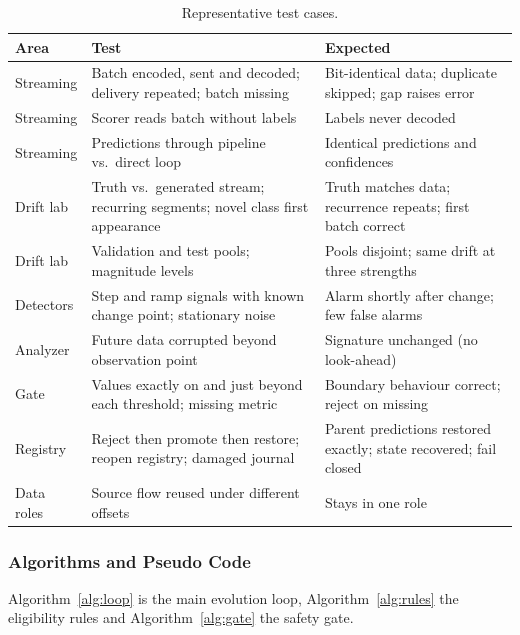 \documentclass{article}
\begin{document}
\begin{table}[h]
\centering
\caption{Representative test cases.}
\label{tab:tests}
\small
\begin{tabular}{p{3.0cm}p{6.2cm}p{3.4cm}}
\toprule
Area & Test & Expected \\
\midrule
Streaming & Batch encoded, sent and decoded; delivery repeated; batch missing & Bit-identical data; duplicate skipped; gap raises error \\
Streaming & Scorer reads batch without labels & Labels never decoded \\
Streaming & Predictions through pipeline vs.\ direct loop & Identical predictions and confidences \\
Drift lab & Truth vs.\ generated stream; recurring segments; novel class first appearance & Truth matches data; recurrence repeats; first batch correct \\
Drift lab & Validation and test pools; magnitude levels & Pools disjoint; same drift at three strengths \\
Detectors & Step and ramp signals with known change point; stationary noise & Alarm shortly after change; few false alarms \\
Analyzer & Future data corrupted beyond observation point & Signature unchanged (no look-ahead) \\
Gate & Values exactly on and just beyond each threshold; missing metric & Boundary behaviour correct; reject on missing \\
Registry & Reject then promote then restore; reopen registry; damaged journal & Parent predictions restored exactly; state recovered; fail closed \\
Data roles & Source flow reused under different offsets & Stays in one role \\
\bottomrule
\end{tabular}
\end{table}

	\subsubsection{Algorithms and Pseudo Code}

Algorithm~\ref{alg:loop} is the main evolution loop, Algorithm~\ref{alg:rules} the eligibility rules and Algorithm~\ref{alg:gate} the safety gate.
\end{document}

